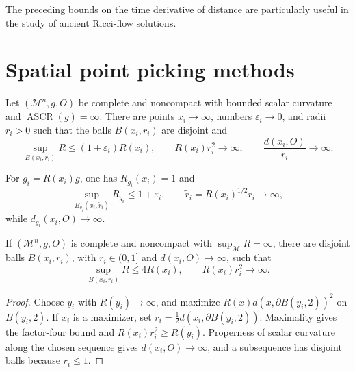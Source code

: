 \begin{remark}
\label{rem:chow-iii-changing-distances-ancient-solutions}
The preceding bounds on the time derivative of distance are particularly
useful in the study of ancient Ricci-flow solutions.
\end{remark}

\section{Spatial point picking methods}

\begin{theorem}
\label{thm:chow-iii-point-picking-infinite-ascr}
Let \((\mathcal M^n,g,O)\) be complete and noncompact with bounded scalar
curvature and \(\operatorname{ASCR}(g)=\infty\).  There are points
\(x_i\to\infty\), numbers \(\varepsilon_i\to0\), and radii \(r_i>0\) such
that the balls \(B(x_i,r_i)\) are disjoint and
\[
 \sup_{B(x_i,r_i)}R\le(1+\varepsilon_i)R(x_i),\qquad
 R(x_i)r_i^2\to\infty,\qquad \frac{d(x_i,O)}{r_i}\to\infty.
\]
\end{theorem}

\begin{remark}
\label{rem:chow-iii-rescaled-point-picked-balls}
For \(g_i=R(x_i)g\), one has \(R_{g_i}(x_i)=1\) and
\[
 \sup_{B_{g_i}(x_i,\widetilde r_i)}R_{g_i}\le1+\varepsilon_i,
 \qquad \widetilde r_i=R(x_i)^{1/2}r_i\to\infty,
\]
while \(d_{g_i}(x_i,O)\to\infty\).
\end{remark}

\begin{proposition}
\label{prop:chow-iii-unbounded-curvature-point-picking-one}
If \((\mathcal M^n,g,O)\) is complete and noncompact with
\(\sup_{\mathcal M} R=\infty\), there are disjoint balls \(B(x_i,r_i)\), with
\(r_i\in(0,1]\) and \(d(x_i,O)\to\infty\), such that
\[
 \sup_{B(x_i,r_i)}R\le4R(x_i),\qquad R(x_i)r_i^2\to\infty.
\]
\end{proposition}
\begin{proof}
Choose \(y_i\) with \(R(y_i)\to\infty\), and maximize
\(R(x)d(x,\partial B(y_i,2))^2\) on \(B(y_i,2)\).  If \(x_i\) is a maximizer,
set \(r_i=\frac12d(x_i,\partial B(y_i,2))\).  Maximality gives the factor-four
bound and \(R(x_i)r_i^2\ge R(y_i)\).  Properness of scalar curvature along the
chosen sequence gives \(d(x_i,O)\to\infty\), and a subsequence has disjoint
balls because \(r_i\le1\).
\end{proof}

